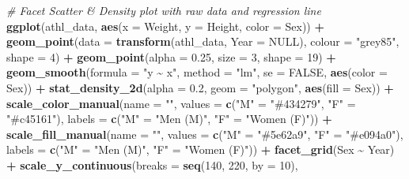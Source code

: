 \documentclass[
]{article}
\newenvironment{Shaded}{\begin{snugshade}}{\end{snugshade}}
\newcommand{\AttributeTok}[1]{\textcolor[rgb]{0.13,0.29,0.53}{#1}}
\newcommand{\CommentTok}[1]{\textcolor[rgb]{0.56,0.35,0.01}{\textit{#1}}}
\newcommand{\ConstantTok}[1]{\textcolor[rgb]{0.56,0.35,0.01}{#1}}
\newcommand{\DecValTok}[1]{\textcolor[rgb]{0.00,0.00,0.81}{#1}}
\newcommand{\FloatTok}[1]{\textcolor[rgb]{0.00,0.00,0.81}{#1}}
\newcommand{\FunctionTok}[1]{\textcolor[rgb]{0.13,0.29,0.53}{\textbf{#1}}}
\newcommand{\NormalTok}[1]{#1}
\newcommand{\OtherTok}[1]{\textcolor[rgb]{0.56,0.35,0.01}{#1}}
\newcommand{\SpecialCharTok}[1]{\textcolor[rgb]{0.81,0.36,0.00}{\textbf{#1}}}
\newcommand{\StringTok}[1]{\textcolor[rgb]{0.31,0.60,0.02}{#1}}
\begin{document}
\begin{Shaded}
\begin{Highlighting}[]
\CommentTok{\# Facet Scatter \& Density plot with raw data and regression line}
\FunctionTok{ggplot}\NormalTok{(athl\_data, }\FunctionTok{aes}\NormalTok{(}\AttributeTok{x =}\NormalTok{ Weight, }\AttributeTok{y =}\NormalTok{ Height, }\AttributeTok{color =}\NormalTok{ Sex)) }\SpecialCharTok{+}
  \FunctionTok{geom\_point}\NormalTok{(}\AttributeTok{data =} \FunctionTok{transform}\NormalTok{(athl\_data, }\AttributeTok{Year =} \ConstantTok{NULL}\NormalTok{),}
             \AttributeTok{colour =} \StringTok{"grey85"}\NormalTok{, }\AttributeTok{shape =} \DecValTok{4}\NormalTok{) }\SpecialCharTok{+}
  \FunctionTok{geom\_point}\NormalTok{(}\AttributeTok{alpha =} \FloatTok{0.25}\NormalTok{, }\AttributeTok{size =} \DecValTok{3}\NormalTok{, }\AttributeTok{shape =} \DecValTok{19}\NormalTok{) }\SpecialCharTok{+}
  \FunctionTok{geom\_smooth}\NormalTok{(}\AttributeTok{formula =} \StringTok{"y \textasciitilde{} x"}\NormalTok{, }\AttributeTok{method =} \StringTok{"lm"}\NormalTok{, }\AttributeTok{se =} \ConstantTok{FALSE}\NormalTok{, }\FunctionTok{aes}\NormalTok{(}\AttributeTok{color =}\NormalTok{ Sex)) }\SpecialCharTok{+}
  \FunctionTok{stat\_density\_2d}\NormalTok{(}\AttributeTok{alpha =} \FloatTok{0.2}\NormalTok{, }\AttributeTok{geom =} \StringTok{"polygon"}\NormalTok{, }\FunctionTok{aes}\NormalTok{(}\AttributeTok{fill =}\NormalTok{ Sex)) }\SpecialCharTok{+}
  \FunctionTok{scale\_color\_manual}\NormalTok{(}\AttributeTok{name =} \StringTok{""}\NormalTok{,}
                     \AttributeTok{values =} \FunctionTok{c}\NormalTok{(}\StringTok{"M"} \OtherTok{=} \StringTok{"\#434279"}\NormalTok{, }\StringTok{"F"} \OtherTok{=} \StringTok{"\#c45161"}\NormalTok{),}
                     \AttributeTok{labels =} \FunctionTok{c}\NormalTok{(}\StringTok{"M"} \OtherTok{=} \StringTok{"Men (M)"}\NormalTok{, }\StringTok{"F"} \OtherTok{=} \StringTok{"Women (F)"}\NormalTok{)) }\SpecialCharTok{+}
  \FunctionTok{scale\_fill\_manual}\NormalTok{(}\AttributeTok{name =} \StringTok{""}\NormalTok{,}
                    \AttributeTok{values =} \FunctionTok{c}\NormalTok{(}\StringTok{"M"} \OtherTok{=} \StringTok{"\#5e62a9"}\NormalTok{, }\StringTok{"F"} \OtherTok{=} \StringTok{"\#e094a0"}\NormalTok{),}
                    \AttributeTok{labels =} \FunctionTok{c}\NormalTok{(}\StringTok{"M"} \OtherTok{=} \StringTok{"Men (M)"}\NormalTok{, }\StringTok{"F"} \OtherTok{=} \StringTok{"Women (F)"}\NormalTok{)) }\SpecialCharTok{+}
  \FunctionTok{facet\_grid}\NormalTok{(Sex }\SpecialCharTok{\textasciitilde{}}\NormalTok{ Year) }\SpecialCharTok{+}
  \FunctionTok{scale\_y\_continuous}\NormalTok{(}\AttributeTok{breaks =} \FunctionTok{seq}\NormalTok{(}\DecValTok{140}\NormalTok{, }\DecValTok{220}\NormalTok{, }\AttributeTok{by =} \DecValTok{10}\NormalTok{),}

\end{Highlighting}
\end{Shaded}
\end{document}
